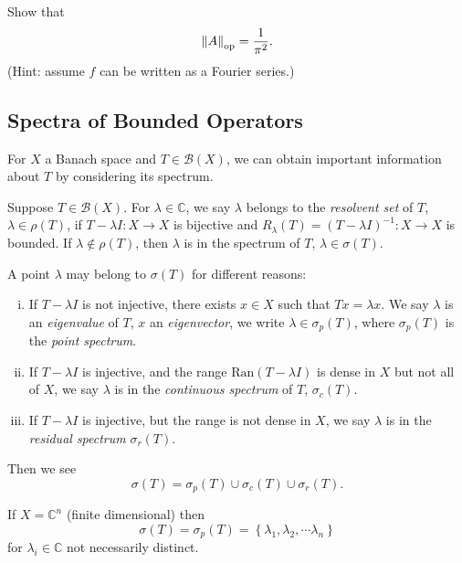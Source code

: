 \documentclass[a4paper,11pt]{article}
\begin{document}
	\begin{exer}
		Show that $$\norm{A}_{\text{op}} = \frac{1}{\pi^2}.$$ (Hint: assume $f$ can be written as a Fourier series.)
	\end{exer}

	\subsection{Spectra of Bounded Operators}

	For $X$ a Banach space and $T \in \mathcal{B}(X)$, we can obtain important information about $T$ by considering its spectrum. 

	\begin{defi}
		Suppose $T \in \mathcal{B}(X)$. For $\lambda \in \mathbb{C}$, we say $\lambda$ belongs to the \emph{resolvent set} of $T$, $\lambda \in \rho(T)$, if $T - \lambda I : X \to X$ is bijective and $R _{\lambda}(T) = (T - \lambda I)^{-1} : X \to X$ is bounded. If $\lambda \not \in \rho(T)$, then $\lambda$ is in the spectrum of $T$, $\lambda \in \sigma(T)$. 
	\end{defi}

	A point $\lambda$ may belong to $\sigma(T)$ for different reasons:
	\begin{enumerate}[i)]
		\item If $T - \lambda I$ is not injective, there exists $x \in X$ such that $T x = \lambda x$. We say $\lambda$ is an \emph{eigenvalue} of $T$, $x$ an \emph{eigenvector}, we write $\lambda \in \sigma_p(T)$, where $\sigma_p(T)$ is the \emph{point spectrum}.
		\item If $T - \lambda I$ is injective, and the range $\text{Ran}(T - \lambda I)$ is dense in $X$ but not all of $X$, we say $\lambda$ is in the \emph{continuous spectrum} of $T$, $\sigma_c(T)$.
		\item If $T - \lambda I$ is injective, but the range is not dense in $X$, we say $\lambda$ is in the \emph{residual spectrum} $\sigma_r (T)$.
	\end{enumerate}
	Then we see
	\[
		\sigma(T) = \sigma_p(T) \cup \sigma_c(T) \cup \sigma_r(T).
	\]

	\begin{ex}
		If $X = \mathbb{C}^n$ (finite dimensional) then 
		\[
			\sigma(T) = \sigma_p(T) = \left\{ \lambda_1, \lambda_2,\cdots \lambda_n \right\}
		\]
		for $\lambda_i \in \mathbb{C}$ not necessarily distinct.
	\end{ex}
\end{document}
